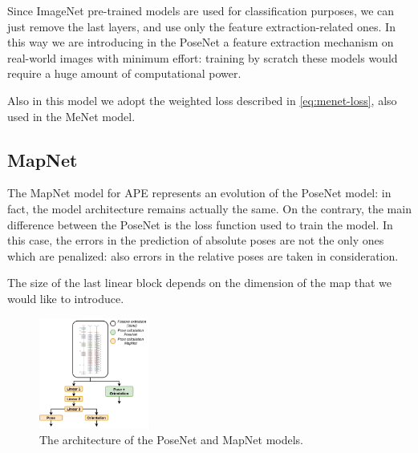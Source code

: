 Since ImageNet pre-trained models are used for classification purposes, we can just remove the last layers, and use only the feature extraction-related ones. In this way we are introducing in the PoseNet a feature extraction mechanism on real-world images with minimum effort: training by scratch these models would require a huge amount of computational power.

Also in this model we adopt the weighted loss described in \cref{eq:menet-loss}, also used in the MeNet model.

\subsection{MapNet}
The MapNet model for APE represents an evolution of the PoseNet model: in fact, the model architecture remains actually the same. On the contrary, the main difference between the PoseNet is the loss function used to train the model. In this case, the errors in the prediction of absolute poses are not the only ones which are penalized: also errors in the relative poses are taken in consideration.

The size of the last linear block depends on the dimension of the map that we would like to introduce.

\begin{figure}[h]
    \begin{center}
        \includegraphics[width=0.32\textwidth]{./imgs/mapnet_posenet_structure.png}
    \end{center}
    \caption{The architecture of the PoseNet and MapNet models.}
    \label{fig:mapnet-posenet-structure}
\end{figure}
